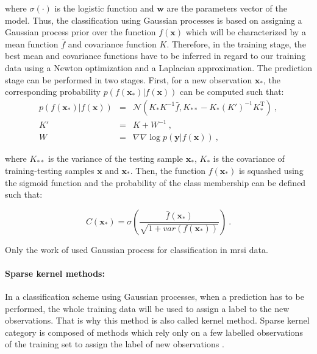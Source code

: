 \noindent where $\sigma(\cdot)$ is the logistic function and $\mathbf{w}$ are the parameters vector of the model.
Thus, the classification using Gaussian processes is based on assigning a Gaussian process prior over the function $f(\mathbf{x})$ which will be characterized by a mean function $\bar{f}$ and covariance function $K$.
Therefore, in the training stage, the best mean and covariance functions have to be inferred in regard to our training data using a Newton optimization and a Laplacian approximation.
The prediction stage can be performed in two stages.
First, for a new observation $\mathbf{x}_*$, the corresponding probability $p(f(\mathbf{x}_*)|f(\mathbf{x}))$ can be computed such that:
\begin{eqnarray}
	p(f(\mathbf{x}_*)|f(\mathbf{x})) & = & \mathcal{N}( K_*K^{-1}\bar{f}, K_{**}-K_*(K')^{-1}K_*^{\text{T}} ) \ , \nonumber \\
	K' & = & K + W^{-1} \ , \label{eq:gp2} \\
	W & = & \nabla \nabla \log p(\mathbf{y}|f(\mathbf{x})) \ , \nonumber
\end{eqnarray}

\noindent where $K_{**}$ is the variance of the testing sample $\mathbf{x}_*$, $K_{*}$ is the covariance of training-testing samples $\mathbf{x}$ and $\mathbf{x}_*$.
Then, the function $f(\mathbf{x}_*)$ is squashed using the sigmoid function and the probability of the class membership can be defined such that:

\begin{equation}
	C(\mathbf{x}_*) = \sigma\left( \frac{\bar{f}(\mathbf{x_*})}{\sqrt{1+var(f(\mathbf{x}_*))}} \right) \ .
	\label{eq:gp3}
\end{equation}

Only the work of \cite{Kelm2007} used Gaussian process for classification in \ac{mrsi} data.

\paragraph{Sparse kernel methods:}
In a classification scheme using Gaussian processes, when a prediction has to be performed, the whole training data will be used to assign a label to the new observations.
That is why this method is also called kernel method.
Sparse kernel category is composed of methods which rely only on a few labelled observations of the training set to assign the label of new observations \cite{Bishop2006}.

